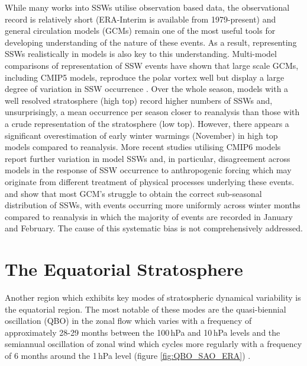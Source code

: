While many works into SSWs utilise observation based data, the observational record is relatively short (ERA-Interim is available from 1979-present) and general circulation models (GCMs) remain one of the most useful tools for developing understanding of the nature of these events. As a result, representing SSWs realistically in models is also key to this understanding. Multi-model comparisons of representation of SSW events have shown that large scale GCMs, including CMIP5 models, reproduce the polar vortex well but display a large degree of variation in SSW occurrence \citep{Kim2017, Butchart2011}. Over the whole season, models with a well resolved stratosphere (high top) record higher numbers of SSWs and, unsurprisingly, a mean occurrence per season closer to reanalysis than those with a crude representation of the stratosphere (low top). However, there appears a significant overestimation of early winter warmings (November) in high top models compared to reanalysis. More recent studies utilising CMIP6 models report further variation in model SSWs and, in particular, disagreement across models in the response of SSW occurrence to anthropogenic forcing \citep{ayarzaguenaUncertainty2020b} which may originate from different treatment of physical processes underlying these events. \cite{Charlton2007} and \cite{Schmidt2013} show that most GCM’s struggle to obtain the correct sub-seasonal distribution of SSWs, with events occurring more uniformly across winter months compared to reanalysis in which the majority of events are recorded in January and February. The cause of this systematic bias is not comprehensively addressed.

\section{The Equatorial Stratosphere}\label{sec:equatorial_strat}
Another region which exhibits key modes of stratospheric dynamical variability is the equatorial region. The most notable of these modes are the quasi-biennial oscillation (QBO) in the zonal flow which varies with a frequency of approximately 28-29 months between the 100\,hPa and 10\,hPa levels and the semiannual oscillation of zonal wind which cycles more regularly with a frequency of 6 months around the 1\,hPa level (figure \ref{fig:QBO_SAO_ERA}) \citep{Baldwin1991}.

